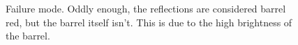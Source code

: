 \documentclass[letterpaper, 10 pt, conference]{ieeeconf}  %
\begin{document}
   
   \begin{figure}[thpb]
      \centering
      
      \caption{Failure mode. Oddly enough, the reflections are considered barrel red, but the barrel itself isn't. This is due to the high brightness of the barrel.}
      \label{resulttest3}
   \end{figure}
   
\end{document}
